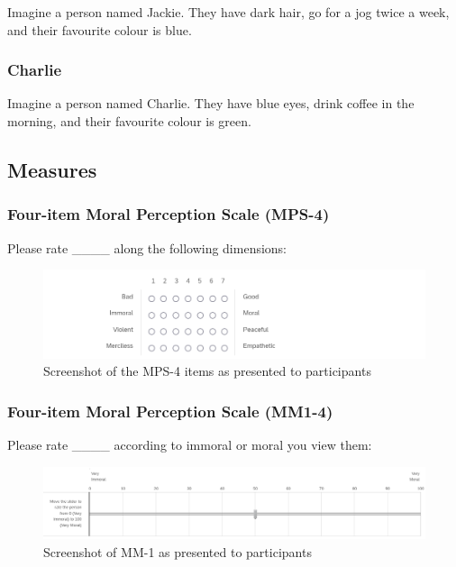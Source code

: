 \documentclass[
  american,
  man,floatsintext]{apa7}
\begin{document}
Imagine a person named Jackie.
They have dark hair, go for a jog twice a week, and their favourite colour is blue.

\hypertarget{charlie-1}{%
\subsubsection{Charlie}\label{charlie-1}}

Imagine a person named Charlie.
They have blue eyes, drink coffee in the morning, and their favourite colour is green.

\hypertarget{measures}{%
\subsection{Measures}\label{measures}}

\hypertarget{four-item-moral-perception-scale-mps-4}{%
\subsubsection{Four-item Moral Perception Scale (MPS-4)}\label{four-item-moral-perception-scale-mps-4}}

Please rate \_\_\_\_ along the following dimensions:

\begin{figure}
\centering
\includegraphics{../resources/images/mps4.png}
\caption{Screenshot of the MPS-4 items as presented to participants}
\end{figure}

\hypertarget{four-item-moral-perception-scale-mm1-4}{%
\subsubsection{Four-item Moral Perception Scale (MM1-4)}\label{four-item-moral-perception-scale-mm1-4}}

Please rate \_\_\_\_ according to immoral or moral you view them:

\begin{figure}
\centering
\includegraphics{../resources/images/mm1.png}
\caption{Screenshot of MM-1 as presented to participants}
\end{figure}
\end{document}
